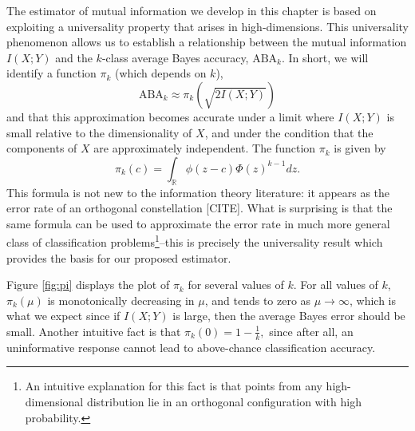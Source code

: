 The estimator of mutual information we develop in this chapter is
based on exploiting a universality property that arises in
high-dimensions.  This universality phenomenon allows us to establish
a relationship between the mutual information $I(X; Y)$ and the
$k$-class average Bayes accuracy, $\text{ABA}_k$.  In short, we will
identify a function $\pi_k$ (which depends on $k$),
\begin{equation}\label{abepi}
\text{ABA}_k \approx \pi_k(\sqrt{2 I(X; Y)})
\end{equation}
and that this approximation becomes accurate under a limit where $I(X;
Y)$ is small relative to the dimensionality of $X$, and under the
condition that the components of $X$ are approximately independent.
The function $\pi_k$ is given by
\[
\pi_k(c) = \int_{\mathbb{R}} \phi(z - c)  \Phi(z)^{k-1} dz.
\]
This formula is not new to the information theory literature: it
appears as the error rate of an orthogonal constellation [CITE].  What
is surprising is that the same formula can be used to approximate the
error rate in much more general class of classification
problems\footnote{An intuitive explanation for this fact is that
  points from any high-dimensional distribution lie in an orthogonal
  configuration with high probability.}--this is precisely the
universality result which provides the basis for our proposed
estimator.

Figure \ref{fig:pi} displays the plot of $\pi_k$ for several values of
$k$.  For all values of $k$, $\pi_k(\mu)$ is monotonically decreasing
in $\mu$, and tends to zero as $\mu \to \infty$, which is what we
expect since if $I(X; Y)$ is large, then the average Bayes error
should be small.  Another intuitive fact is that $ \pi_k(0) = 1 -
\frac{1}{k}, $ since after all, an uninformative response cannot lead
to above-chance classification accuracy.


